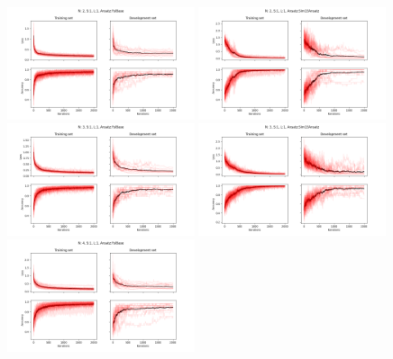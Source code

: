 \begin{figure}[h]%
\centering
\includegraphics[width=0.49\textwidth]{figures/single_model/FslBase/Epochs_2000--A_0.05--N_2--S_1--L_1--Ansatz_FslBase.png}
\includegraphics[width=0.49\textwidth]{figures/single_model/Sim15Ansatz/Epochs_2000--A_0.05--N_2--S_1--L_1.png}
\includegraphics[width=0.49\textwidth]{figures/single_model/FslBase/Epochs_2000--A_0.05--N_3--S_1--L_1--Ansatz_FslBase.png}
\includegraphics[width=0.49\textwidth]{figures/single_model/Sim15Ansatz/Epochs_2000--A_0.05--N_3--S_1--L_1.png}
\includegraphics[width=0.49\textwidth]{figures/single_model/FslBase/Epochs_2000--A_0.05--N_4--S_1--L_1--Ansatz_FslBase.png}

\end{figure}
